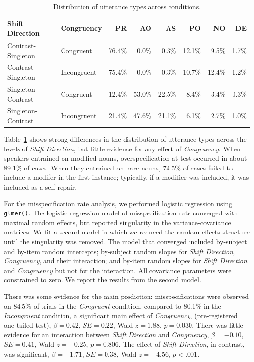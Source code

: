 \documentclass[natbib,doc,a4paper]{apa6}
\begin{document}
\begin{table}[ht]
\centering
\caption{Distribution of utterance types across conditions.} 
\label{tbl:exp2-utt-dist}
\begin{tabular}{llrrrrrr}
  \hline
Shift Direction & Congruency & PR & AO & AS & PO & NO & DE \\ 
  \hline
Contrast-Singleton & Congruent & 76.4\% & 0.0\% & 0.3\% & 12.1\% & 9.5\% & 1.7\% \\ 
  Contrast-Singleton & Incongruent & 75.4\% & 0.0\% & 0.3\% & 10.7\% & 12.4\% & 1.2\% \\ 
  Singleton-Contrast & Congruent & 12.4\% & 53.0\% & 22.5\% & 8.4\% & 3.4\% & 0.3\% \\ 
  Singleton-Contrast & Incongruent & 21.4\% & 47.6\% & 21.1\% & 6.1\% & 2.7\% & 1.0\% \\ 
   \hline
\end{tabular}
\end{table}

Table~\ref{tbl:exp2-utt-dist} shows strong differences in the distribution of utterance types across the levels of \emph{Shift Direction}, but little evidence for any effect of \emph{Congruency}.  When speakers entrained on modified nouns, overspecification at test occurred in about
89.1\%  
of cases. When they entrained on bare nouns, 
74.5\%
of cases failed to include a modifer in the first instance; typically, if a modifier was included, it was included as a self-repair.

For the misspecification rate analysis, we performed logistic regression using \texttt{glmer()}.  The logistic regression model of misspecification rate converged with maximal random effects, but reported singularity in the variance-covariance matrices. We fit a second model in which we reduced the random effects structure until the singularity was removed. The model that converged included by-subject and by-item random intercepts; by-subject random slopes for \emph{Shift Direction}, \emph{Congruency}, and their interaction; and by-item random slopes for \emph{Shift Direction} and \emph{Congruency} but not for the interaction. All covariance parameters were constrained to zero.  We report the results from the second model.

There was some evidence for the main prediction: misspecifications were observed on 
84.5\%
of trials in the \emph{Congruent} condition, compared to 
80.1\%
in the \emph{Incongruent} condition, a significant main effect of \emph{Congruency}, (pre-registered one-tailed test), 
\(\beta = 0.42\), \(SE = 0.22\), Wald \(z = 1.88\), \(p = 0.030\).
There was little evidence for an interaction between \emph{Shift Direction} and \emph{Congruency}, 
\(\beta = -0.10\), \(SE = 0.41\), Wald \(z = -0.25\), \(p = 0.806\).
The effect of \emph{Shift Direction}, in contrast, was significant,
\(\beta = -1.71\), \(SE = 0.38\), Wald \(z = -4.56\), \(p < .001\).
\end{document}

